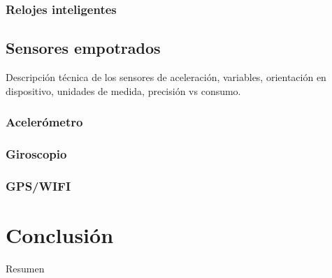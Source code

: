 \subsubsection{Relojes inteligentes}

\subsection{Sensores empotrados}

\label{ssec46:sensores-empotrados}Descripción técnica de los sensores
de aceleración, variables, orientación en dispositivo, unidades de
medida, precisión vs consumo.

\subsubsection{Acelerómetro}

\subsubsection{Giroscopio}

\subsubsection{GPS/WIFI}

\section{Conclusión}

Resumen
